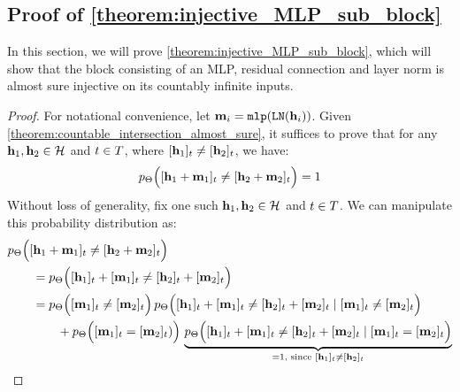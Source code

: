 \subsection{\texorpdfstring{Proof of \cref{theorem:injective_MLP_sub_block}}{Theorem}}\label{appsubsec:proof_injective_MLP_sub_block}
In this section, we will prove \cref{theorem:injective_MLP_sub_block}, which will show that the block consisting of an MLP, residual connection and layer norm is almost sure injective on its countably infinite inputs.
\injectiveMLPsubblock* 
\begin{proof}
    For notational convenience, let $\mathbf{m}_{i}=\mathtt{mlp}(\mathtt{LN}(\mathbf{h}_i))$. 
    Given \cref{theorem:countable_intersection_almost_sure}, it suffices to prove that for any $\mathbf{h}_1,\mathbf{h}_2\in\mathcal{H}$ and $t\in T$, where $[\mathbf{h}_1]_t\neq[\mathbf{h}_2]_t$, we have:
    \begin{align}
        p_{\Theta}\Big([\mathbf{h}_1+\mathbf{m}_{1}]_t\neq[\mathbf{h}_2+\mathbf{m}_{2}]_t\Big)=1
    \end{align}
    Without loss of generality, fix one such $\mathbf{h}_1,\mathbf{h}_2\in\mathcal{H}$ and $t\in T$.
    We can manipulate this probability distribution as:
    \begin{subequations}
    \begin{align}
        &\prob_{\Parameters}\Big([\hiddenstates_1+\MLP_{1}]_\tokenposition\neq[\hiddenstates_2+\MLP_{2}]_\tokenposition\Big) \nonumber \\
        &\qquad= \prob_{\Parameters}\Big([\hiddenstates_1]_\tokenposition+[\MLP_{1}]_\tokenposition\neq[\hiddenstates_2]_\tokenposition+[\MLP_{2}]_\tokenposition \Big) \nonumber\\
        &\qquad= \prob_{\Parameters}\Big([\MLP_{1}]_\tokenposition\neq[\MLP_{2}]_\tokenposition\Big)\,\prob_{\Parameters}\Big([\hiddenstates_1]_\tokenposition+[\MLP_{1}]_\tokenposition\neq[\hiddenstates_2]_\tokenposition+[\MLP_{2}]_\tokenposition\mid [\MLP_{1}]_\tokenposition\neq[\MLP_{2}]_\tokenposition\Big)  \\
        &\qquad\qquad+\prob_{\Parameters}\Big([\MLP_{1}]_\tokenposition=[\MLP_{2}]_\tokenposition)\Big)\, \underbrace{\prob_{\Parameters}\Big([\hiddenstates_1]_\tokenposition+[\MLP_{1}]_\tokenposition\neq[\hiddenstates_2]_\tokenposition+[\MLP_{2}]_\tokenposition\mid [\MLP_{1}]_\tokenposition=[\MLP_{2}]_\tokenposition\Big)}_{=1\text{, since } [\hiddenstates_1]_\tokenposition\neq[\hiddenstates_2]_\tokenposition} \nonumber\\

\end{align}
\end{subequations}
\end{proof}
